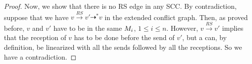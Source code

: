 \begin{proof}
  Now, we show that there is no RS edge in any SCC.
  By contradiction, suppose that we have $v \xrightarrow{RS} v' \dashrightarrow^* v$ in the extended conflict graph. Then, as proved before, $v$ and $v'$ have to be in the same $M_i$, $1 \leq i \leq n$. However, $v \xrightarrow{RS} v'$ implies that the reception of $v$ has to be done before the send of $v'$, but a  can, by definition, be linearized with all the sends followed by all the receptions. So we have a contradiction.

\end{proof}
